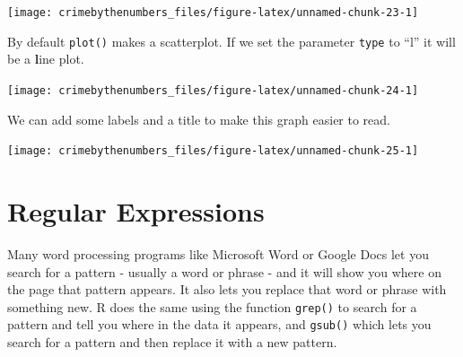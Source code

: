 \documentclass[
  12pt,
  openany]{book}
\newenvironment{Shaded}{\begin{snugshade}}{\end{snugshade}}
\newcommand{\AttributeTok}[1]{\textcolor[rgb]{0.61,0.61,0.61}{#1}}
\newcommand{\FunctionTok}[1]{\textcolor[rgb]{0,0,0}{#1}}
\newcommand{\NormalTok}[1]{#1}
\newcommand{\SpecialCharTok}[1]{\textcolor[rgb]{0,0,0}{#1}}
\newcommand{\StringTok}[1]{\textcolor[rgb]{0.5,0.5,0.5}{#1}}
\begin{document}
\begin{center}\texttt{[image: crimebythenumbers\_files/figure-latex/unnamed-chunk-23-1]} \end{center}

By default \texttt{plot()} makes a scatterplot. If we set the parameter \texttt{type} to ``l'' it will be a \textbf{l}ine plot.

\begin{Shaded}
\end{Shaded}

\begin{center}\texttt{[image: crimebythenumbers\_files/figure-latex/unnamed-chunk-24-1]} \end{center}

We can add some labels and a title to make this graph easier to read.

\begin{Shaded}
\end{Shaded}

\begin{center}\texttt{[image: crimebythenumbers\_files/figure-latex/unnamed-chunk-25-1]} \end{center}

\hypertarget{regular-expressions}{%
\chapter{Regular Expressions}\label{regular-expressions}}

Many word processing programs like Microsoft Word or Google Docs let you search for a pattern - usually a word or phrase - and it will show you where on the page that pattern appears. It also lets you replace that word or phrase with something new. R does the same using the function \texttt{grep()} to search for a pattern and tell you where in the data it appears, and \texttt{gsub()} which lets you search for a pattern and then replace it with a new pattern.
\end{document}
